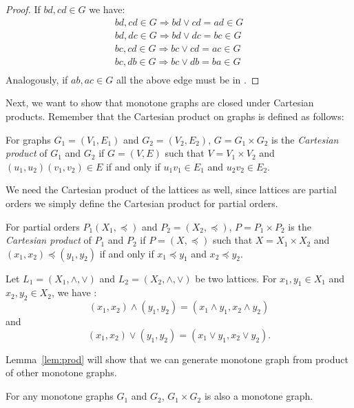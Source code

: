 \begin{proof}
If \(bd, cd \in G\) we have:
\begin{eqnarray*}
bd, cd \in G \Rightarrow bd \vee cd = ad \in G \\
bd, dc \in G \Rightarrow bd \vee dc = bc \in G \\
bc, cd \in G \Rightarrow bc \vee cd = ac \in G \\
bc, db \in G \Rightarrow bc \vee db = ba \in G \\
\end{eqnarray*}
Analogously, if \(ab, ac\in G\) all the above edge must be in \mG\@.
\end{proof}


Next, we want to show that monotone graphs are closed under Cartesian products.
Remember that the Cartesian product on graphs is defined as follows:
\begin{defi} 
For graphs \(G_1=(V_1,E_1)\) and \(G_2=(V_2,E_2)\), \(G = G_1 \times G_2\)
is the \emph{Cartesian product} of \(G_1\) and \(G_2\) if \(G=(V,E)\)
such that \(V=V_1 \times V_2\) and \((u_1,u_2)(v_1,v_2) \in E\)
if and only if \(u_1v_1 \in E_1\) and \(u_2v_2 \in E_2\)\@.
\end{defi}

We need the Cartesian product of the lattices as well,
since lattices are partial orders we simply define the Cartesian product
for partial orders.
\begin{defi} 
For partial orders \(P_1(X_1,\preceq)\) and \(P_2=(X_2,\preceq)\), 
\(P= P_1 \times P_2\) is the \emph{Cartesian product} of \(P_1\) and \(P_2\)
if \(P=(X,\preceq)\) such that \(X=X_1\times X_2\) and \((x_1,x_2) \preceq (y_1,y_2)\)
if and only if \(x_1\preceq y_1\) and \(x_2\preceq y_2\)\@.
\end{defi}

\begin{rem}
Let \(L_1=(X_1,\wedge,\vee)\) and \(L_2=(X_2,\wedge,\vee)\) be two lattices.
For \(x_1,y_1 \in X_1\) and \(x_2,y_2\in X_2\), we have :
\[(x_1,x_2)\wedge (y_1,y_2) = (x_1\wedge y_1, x_2 \wedge y_2) \]
and \[(x_1,x_2)\vee (y_1,y_2) = (x_1\vee y_1, x_2 \vee y_2).\]
\end{rem}

Lemma~\ref{lem:prod} will show that we can generate monotone graph from product of other
monotone graphs.

\begin{lemma}\label{lem:prod}
For any monotone graphs \(G_1\) and \(G_2\), \(G_1 \times G_2\) is also a monotone graph.
\end{lemma}

